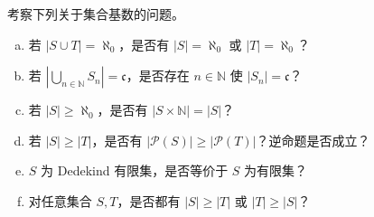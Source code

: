 \documentclass[lang=cn,a4paper,fontset=none,zihao=false,10pt,openany,twoside]{beautybook}
\numberwithin{algorithm}{chapter}
\newcommand{\N}{\mathbb N}
\newcommand{\Pow}{\mathcal P}
\begin{document}
\Needspace{75mm}
\begin{example}
考察下列关于集合基数的问题。
\begin{enumerate}[(a)]
\item 若 $|S\cup T|=\aleph_0$，是否有 $|S|=\aleph_0$ 或 $|T|=\aleph_0$？
\item 若 $\left|\bigcup_{n\in\N}S_n\right|=\mathfrak c$，是否存在 $n\in\N$ 使 $|S_n|=\mathfrak c$？
\item 若 $|S|\geq\aleph_0$，是否有 $|S\times\N|=|S|$？
\item 若 $|S|\geq|T|$，是否有 $|\Pow(S)|\geq|\Pow(T)|$？逆命题是否成立？
\item $S$ 为 Dedekind 有限集，是否等价于 $S$ 为有限集？
\item 对任意集合 $S,T$，是否都有 $|S|\geq|T|$ 或 $|T|\geq|S|$？
\end{enumerate}
\end{example}
\end{document}
